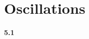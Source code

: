 \documentclass[../problems.tex]{subfiles}
\begin{document}
\section{Oscillations}
\barh

\paragraph{5.1}
\end{document}
